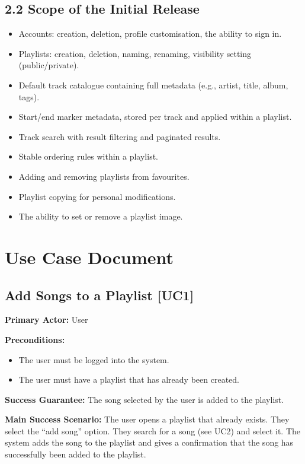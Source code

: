\documentclass{article}
\begin{document}
\subsection{2.2 Scope of the Initial Release}
\begin{itemize}
    \item Accounts: creation, deletion, profile customisation, the ability to sign in.
    \item Playlists: creation, deletion, naming, renaming, visibility setting (public/private).
    \item Default track catalogue containing full metadata (e.g., artist, title, album, tags).
    \item Start/end marker metadata, stored per track and applied within a playlist.
    \item Track search with result filtering and paginated results.
    \item Stable ordering rules within a playlist.
    \item Adding and removing playlists from favourites.
    \item Playlist copying for personal modifications.
    \item The ability to set or remove a playlist image.
\end{itemize}

\section{Use Case Document}

\subsection{Add Songs to a Playlist [UC1]}
\textbf{Primary Actor:} User

\textbf{Preconditions:} 
\begin{itemize}
  \item The user must be logged into the system.
  \item The user must have a playlist that has already been created.
\end{itemize}

\textbf{Success Guarantee:}  
The song selected by the user is added to the playlist.

\textbf{Main Success Scenario:}  
The user opens a playlist that already exists. They select the ``add song'' option. They search for a song (see UC2) and select it. The system adds the song to the playlist and gives a confirmation that the song has successfully been added to the playlist.
\end{document}
